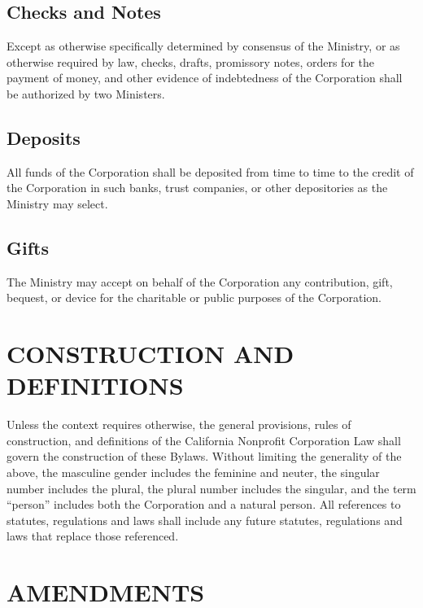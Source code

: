 \documentclass[letterpaper,titlepage]{article}
\begin{document}
\subsection{Checks and Notes}
\label{sec:checksNotes}
Except as otherwise specifically determined by consensus of the Ministry, or as
otherwise required by law, checks, drafts, promissory notes, orders for the
payment of money, and other evidence of indebtedness of the Corporation shall
be authorized by two Ministers. 
\subsection{Deposits}
\label{sec:deposits}
All funds of the Corporation shall be deposited from time to time to the credit
of the Corporation in such banks, trust companies, or other depositories as the
Ministry may select.
\subsection{Gifts}
\label{sec:gifts}
The Ministry may accept on behalf of the Corporation any contribution, gift,
bequest, or device for the charitable or public purposes of the Corporation.
\section{CONSTRUCTION AND DEFINITIONS}
\label{sec:constructionDefinitions}
Unless the context requires otherwise, the general provisions, rules of
construction, and definitions of the California Nonprofit Corporation Law shall
govern the construction of these Bylaws. Without limiting the generality of the
above, the masculine gender includes the feminine and neuter, the singular
number includes the plural, the plural number includes the singular, and the
term ``person'' includes both the Corporation and a natural person. All
references to statutes, regulations and laws shall include any future statutes,
regulations and laws that replace those referenced.
\section{AMENDMENTS}
\label{sec:amendments}
\end{document}

